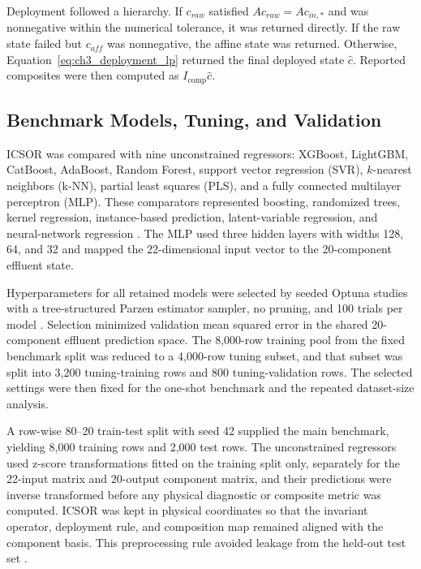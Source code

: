 \documentclass[12pt, twoside]{book}
\begin{document}
Deployment followed a hierarchy. If \(c_{raw}\) satisfied \(Ac_{raw}=Ac_{in,*}\) and was nonnegative within
the numerical tolerance, it was returned directly. If the raw state failed but \(c_{aff}\) was nonnegative,
the affine state was returned. Otherwise, Equation~\eqref{eq:ch3_deployment_lp} returned the final deployed
state \(\hat{c}\). Reported composites were then computed as \(I_{\mathrm{comp}}\hat{c}\).

\subsection{Benchmark Models, Tuning, and Validation}

ICSOR was compared with nine unconstrained regressors: XGBoost, LightGBM, CatBoost, AdaBoost, Random Forest,
support vector regression (SVR), \(k\)-nearest neighbors (k-NN), partial least squares (PLS), and a fully
connected multilayer perceptron (MLP). These comparators represented boosting, randomized trees, kernel
regression, instance-based prediction, latent-variable regression, and neural-network regression
\citep{Breiman2001,ChenGuestrin2016,Wold2001,Borisov2024}. The MLP used three hidden layers with widths 128,
64, and 32 and mapped the 22-dimensional input vector to the 20-component effluent state.

Hyperparameters for all retained models were selected by seeded Optuna studies with a tree-structured Parzen
estimator sampler, no pruning, and 100 trials per model \citep{Akiba2019}. Selection minimized validation
mean squared error in the shared 20-component effluent prediction space. The 8,000-row training pool from the
fixed benchmark split was reduced to a 4,000-row tuning subset, and that subset was split into 3,200
tuning-training rows and 800 tuning-validation rows. The selected settings were then fixed for the one-shot
benchmark and the repeated dataset-size analysis.

A row-wise 80--20 train-test split with seed 42 supplied the main benchmark, yielding 8,000 training rows and
2,000 test rows. The unconstrained regressors used z-score transformations fitted on the training split only,
separately for the 22-input matrix and 20-output component matrix, and their predictions were inverse
transformed before any physical diagnostic or composite metric was computed. ICSOR was kept in physical
coordinates so that the invariant operator, deployment rule, and composition map remained aligned with the
component basis. This preprocessing rule avoided leakage from the held-out test set \citep{Pinheiro2025}.
\end{document}

